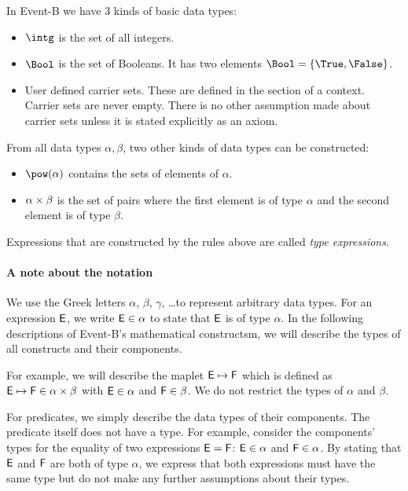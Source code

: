 In Event-B we have 3 kinds of basic data types:
\begin{itemize}
\item {} $\intg$ is the set of all integers.
\item {}
  $\Bool$ is the set of Booleans. 
  It has two elements $\Bool = \{\True,\False\}$.
\item {}
  User defined carrier sets. 
  These are defined in the  section of a context.
  Carrier sets are never empty.
  There is no other assumption made about carrier sets unless it is stated explicitly as
  an axiom.
\end{itemize}
From all data types $\alpha, \beta$, two other kinds of data types can be constructed:
\begin{itemize}
\item $\pow(\alpha)$ contains the sets of elements of $\alpha$.
\item {} $\alpha\mathbin\times\beta$ is the set of pairs where the first element is of type $\alpha$ and the
  second element is of type $\beta$.
\end{itemize}
 Expressions that are constructed by the rules above are called \emph{type expressions}.

\paragraph{A note about the notation}
We use the Greek letters $\alpha$, $\beta$, $\gamma$, \ldots to represent arbitrary data types.
For an expression $\textsf{E}$, we write $\textsf{E}\in\alpha$ to state that $\textsf{E}$ is of type $\alpha$.
In the following descriptions of Event-B's mathematical constructsm, we will describe the
  types of all constructs and their components.

For example, we will describe the maplet $\textsf{E}\mapsto \textsf{F}$ which is defined as $\textsf{E}\mapsto \textsf{F}\in\alpha\mathbin\times\beta$ with
 $\textsf{E}\in\alpha$ and $\textsf{F}\in\beta$. We do not restrict the types of $\alpha$ and $\beta$.

For predicates, we simply describe the data types of their components. 
The predicate itself does not have a type.
For example, consider the components' types for the equality of two expressions $\textsf{E}=\textsf{F}$: $\textsf{E}\in\alpha$ and $\textsf{F}\in\alpha$.
By stating that $\textsf{E}$ and $\textsf{F}$ are both of type $\alpha$, we express that both expressions must have the
  same type but do not make any further assumptions about their types.

